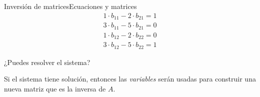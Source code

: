\documentclass[spanish, c]{beamer}
\begin{document}
\begin{frame}{Inversión de matrices}{Ecuaciones y matrices}
        \begin{align}
            1 \cdot b_{11} - 2 \cdot b_{21} = 1 \\
            3 \cdot b_{11} - 5 \cdot b_{21} = 0 \\
            1 \cdot b_{12} - 2 \cdot b_{22} = 0 \\
            3 \cdot b_{12} - 5 \cdot b_{22} = 1
        \end{align} \pause

        ¿Puedes resolver el sistema? \pause \quad {}

        \bigskip

        Si el sistema tiene solución, entonces las \textit{variables} serán usadas para construir una nueva matriz que es la \alert{inversa} de $A$.
\end{frame}







\end{document}
